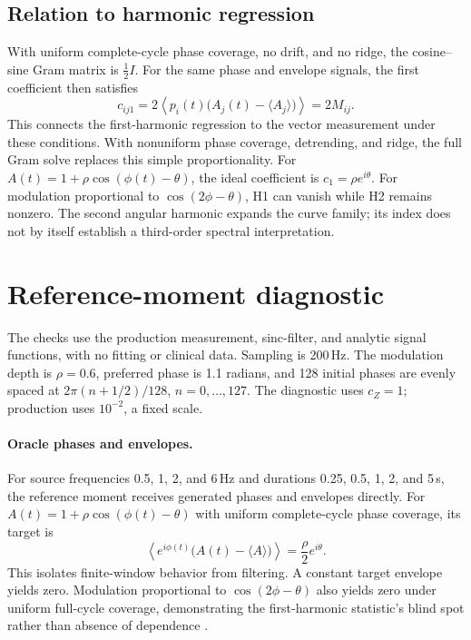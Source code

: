 \documentclass[10pt,twocolumn,letterpaper]{article}
\begin{document}
\subsection{Relation to harmonic regression}
With uniform complete-cycle phase coverage, no drift, and no ridge,
the cosine--sine Gram matrix is $\tfrac12 I$. For the same phase and
envelope signals, the first coefficient then satisfies
\begin{equation}
c_{ij1}=2\left\langle p_i(t)
 \bigl(A_j(t)-\langle A_j\rangle\bigr)\right\rangle
       =2M_{ij}.
\label{eq:regression-moment}
\end{equation}
This connects the first-harmonic regression to the vector measurement
under these conditions. With nonuniform phase coverage, detrending,
and ridge, the full Gram solve replaces this simple proportionality.
For $A(t)=1+\rho\cos(\phi(t)-\theta)$, the ideal coefficient is
$c_1=\rho e^{i\theta}$. For modulation proportional to
$\cos(2\phi-\theta)$, H1 can vanish while H2 remains nonzero.
The second angular harmonic expands the curve family; its index does
not by itself establish a third-order spectral interpretation.

\section{Reference-moment diagnostic}
\label{app:synthetic}
The checks use the production measurement, sinc-filter, and analytic
signal functions, with no fitting or clinical data. Sampling is 200\,Hz.
The modulation depth is $\rho=0.6$, preferred phase is 1.1 radians, and
128 initial phases are evenly spaced at
$2\pi(n+1/2)/128$, $n=0,\ldots,127$.
The diagnostic uses $c_Z=1$; production uses $10^{-2}$, a fixed scale.

\paragraph{Oracle phases and envelopes.}
For source frequencies 0.5, 1, 2, and 6\,Hz and durations
0.25, 0.5, 1, 2, and 5\,s, the reference moment receives generated
phases and envelopes directly. For
$A(t)=1+\rho\cos(\phi(t)-\theta)$ with uniform complete-cycle
phase coverage, its target is
\begin{equation}
\left\langle e^{i\phi(t)}
 \bigl(A(t)-\langle A\rangle\bigr)\right\rangle
 =\frac{\rho}{2}e^{i\theta}.
\label{eq:oracle}
\end{equation}
This isolates finite-window behavior from filtering. A constant target
envelope yields zero. Modulation proportional to $\cos(2\phi-\theta)$
also yields zero under uniform full-cycle coverage, demonstrating the
first-harmonic statistic's blind spot rather than absence of dependence
\citep{tort2010measuring}.
\end{document}
